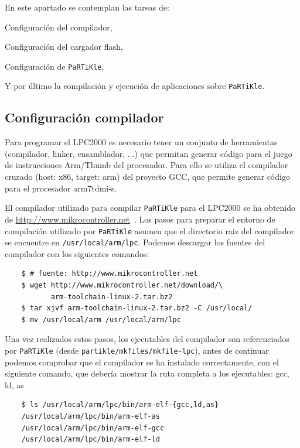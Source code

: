 \documentclass[10pt,a4paper]{article}
\newcommand{\partikle}[0]{\texttt{PaRTiKle}}
\newcommand{\hrefx}[1]{\href{#1}{#1}} %
\newenvironment{itemize*}
        {\begin{itemize}%
                \setlength{\parskip}{2pt}%
                \setlength{\itemsep}{0pt}}
        {\end{itemize}}
\begin{document}
	En este apartado se contemplan las tareas de:
	\begin{itemize*}
	\item Configuración del compilador,
	\item Configuración del cargador flash,
	\item Configuración de \partikle{},
	\item Y por último la compilación y ejecución de aplicaciones sobre \partikle{}.
	\end{itemize*}
	
	\subsection{Configuración compilador}
	
	Para programar el LPC2000 es necesario tener un conjunto de herramientas (compilador, linker, ensamblador, ...) que permitan generar código para el juego de instrucciones Arm/Thumb del procesador. Para ello se utiliza el compilador cruzado (host: x86, target: arm) del proyecto GCC, que permite generar código para el procesador arm7tdmi-s.
	
	El compilador utilizado para compilar \partikle{} para el LPC2000 se ha obtenido de \hrefx{http://www.mikrocontroller.net}~\cite{mikro}. Los pasos para preparar el entorno de compilación utilizado por \partikle{} asumen que el directorio raiz del compilador se encuentre en \texttt{/usr/local/arm/lpc}. Podemos descargar los fuentes del compilador con los siguientes comandos:
	
	\begin{verbatim}
	$ # fuente: http://www.mikrocontroller.net
	$ wget http://www.mikrocontroller.net/download/\
	       arm-toolchain-linux-2.tar.bz2
	$ tar xjvf arm-toolchain-linux-2.tar.bz2 -C /usr/local/
	$ mv /usr/local/arm /usr/local/arm/lpc
	\end{verbatim}
	
	Una vez realizados estos pasos, los ejecutables del compilador son referenciados por \partikle{} (desde \texttt{partikle/\-mkfiles/\-mkfile-lpc}), antes de continuar podemos comprobar que el compilador se ha instalado correctamente, con el siguiente comando, que debería mostrar la ruta completa a los ejecutables: gcc, ld, as
	
	\begin{verbatim}
	$ ls /usr/local/arm/lpc/bin/arm-elf-{gcc,ld,as}
	/usr/local/arm/lpc/bin/arm-elf-as
	/usr/local/arm/lpc/bin/arm-elf-gcc
	/usr/local/arm/lpc/bin/arm-elf-ld
	\end{verbatim}
	
\end{document}
